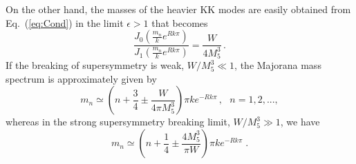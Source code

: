 \documentclass[a4paper,12pt]{article}
\begin{document}
On the other hand, the masses of the  heavier KK modes are easily
obtained from Eq.~(\ref{eq:Cond})
 in the limit $\epsilon> 1$ that becomes
\begin{equation}
 \frac{J_0 \left(\frac{m_n}{k} e^{Rk\pi } \right)}{J_1
  \left(\frac{m_n}{k} e^{Rk\pi } \right)} = \frac{W}{4 M_{5}^{3}}\, .
\end{equation}
If the breaking of supersymmetry is weak, 
$W/M_{5}^{3} \ll 1$,
the Majorana mass spectrum is
approximately given by
 \begin{equation}
m_n \simeq 
\left(n + \frac{3}{4} \pm \frac{W}{4\pi M_{5}^{3}}\right) \pi k
   e^{-Rk\pi }\, , \ \ \ n=1,2,...,
\end{equation}
whereas in the strong supersymmetry breaking limit, 
$W/M_{5}^{3} \gg 1$, we have
\begin{equation}
m_n \simeq \left(n + \frac{1}{4} 
\pm \frac{4 M_{5}^{3}}{\pi W}\right) \pi k
   e^{-Rk\pi }\; .
\end{equation}


\newpage
\end{document}
